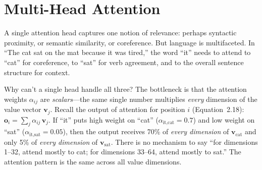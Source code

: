 \section{Multi-Head Attention}
\label{sec:multihead}

A single attention head captures one notion of relevance: perhaps syntactic proximity, or semantic similarity, or coreference. But language is multifaceted. In ``The cat sat on the mat because it was tired,'' the word ``it'' needs to attend to ``cat'' for coreference, to ``sat'' for verb agreement, and to the overall sentence structure for context.

Why can't a single head handle all three? The bottleneck is that the attention weights $\alpha_{ij}$ are \emph{scalars}---the same single number multiplies \emph{every} dimension of the value vector $\mathbf{v}_j$. Recall the output of attention for position $i$ (Equation~2.18): $\mathbf{o}_i = \sum_j \alpha_{ij}\, \mathbf{v}_j$. If ``it'' puts high weight on ``cat'' ($\alpha_{\text{it,cat}} = 0.7$) and low weight on ``sat'' ($\alpha_{\text{it,sat}} = 0.05$), then the output receives 70\% of \emph{every dimension} of $\mathbf{v}_{\text{cat}}$ and only 5\% of \emph{every dimension} of $\mathbf{v}_{\text{sat}}$. There is no mechanism to say ``for dimensions 1--32, attend mostly to cat; for dimensions 33--64, attend mostly to sat.'' The attention pattern is the same across all value dimensions.

